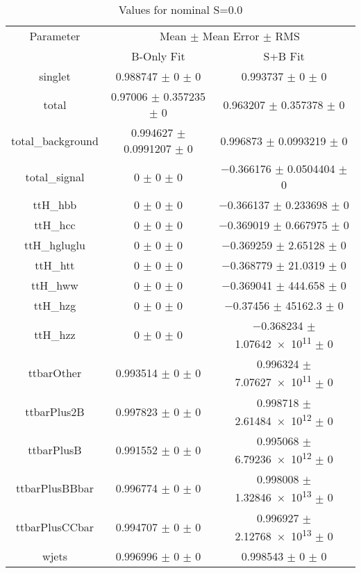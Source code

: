 \begin{table}
\centering
\caption{Values for nominal S=0.0}
\begin{tabular}{ccc}
\toprule
Parameter & \multicolumn{2}{c}{Mean $\pm$ Mean Error $\pm$ RMS}\\
 & B-Only Fit & S+B Fit\\
\midrule
singlet & \num{0.988747} $\pm$ \num{0} $\pm$ \num{0} & \num{0.993737} $\pm$ \num{0} $\pm$ \num{0}\\
total & \num{0.97006} $\pm$ \num{0.357235} $\pm$ \num{0} & \num{0.963207} $\pm$ \num{0.357378} $\pm$ \num{0}\\
total\_background & \num{0.994627} $\pm$ \num{0.0991207} $\pm$ \num{0} & \num{0.996873} $\pm$ \num{0.0993219} $\pm$ \num{0}\\
total\_signal & \num{0} $\pm$ \num{0} $\pm$ \num{0} & \num{-0.366176} $\pm$ \num{0.0504404} $\pm$ \num{0}\\
ttH\_hbb & \num{0} $\pm$ \num{0} $\pm$ \num{0} & \num{-0.366137} $\pm$ \num{0.233698} $\pm$ \num{0}\\
ttH\_hcc & \num{0} $\pm$ \num{0} $\pm$ \num{0} & \num{-0.369019} $\pm$ \num{0.667975} $\pm$ \num{0}\\
ttH\_hgluglu & \num{0} $\pm$ \num{0} $\pm$ \num{0} & \num{-0.369259} $\pm$ \num{2.65128} $\pm$ \num{0}\\
ttH\_htt & \num{0} $\pm$ \num{0} $\pm$ \num{0} & \num{-0.368779} $\pm$ \num{21.0319} $\pm$ \num{0}\\
ttH\_hww & \num{0} $\pm$ \num{0} $\pm$ \num{0} & \num{-0.369041} $\pm$ \num{444.658} $\pm$ \num{0}\\
ttH\_hzg & \num{0} $\pm$ \num{0} $\pm$ \num{0} & \num{-0.37456} $\pm$ \num{45162.3} $\pm$ \num{0}\\
ttH\_hzz & \num{0} $\pm$ \num{0} $\pm$ \num{0} & \num{-0.368234} $\pm$ \num{1.07642e+11} $\pm$ \num{0}\\
ttbarOther & \num{0.993514} $\pm$ \num{0} $\pm$ \num{0} & \num{0.996324} $\pm$ \num{7.07627e+11} $\pm$ \num{0}\\
ttbarPlus2B & \num{0.997823} $\pm$ \num{0} $\pm$ \num{0} & \num{0.998718} $\pm$ \num{2.61484e+12} $\pm$ \num{0}\\
ttbarPlusB & \num{0.991552} $\pm$ \num{0} $\pm$ \num{0} & \num{0.995068} $\pm$ \num{6.79236e+12} $\pm$ \num{0}\\
ttbarPlusBBbar & \num{0.996774} $\pm$ \num{0} $\pm$ \num{0} & \num{0.998008} $\pm$ \num{1.32846e+13} $\pm$ \num{0}\\
ttbarPlusCCbar & \num{0.994707} $\pm$ \num{0} $\pm$ \num{0} & \num{0.996927} $\pm$ \num{2.12768e+13} $\pm$ \num{0}\\
wjets & \num{0.996996} $\pm$ \num{0} $\pm$ \num{0} & \num{0.998543} $\pm$ \num{0} $\pm$ \num{0}\\
\bottomrule
\end{tabular}
\end{table}